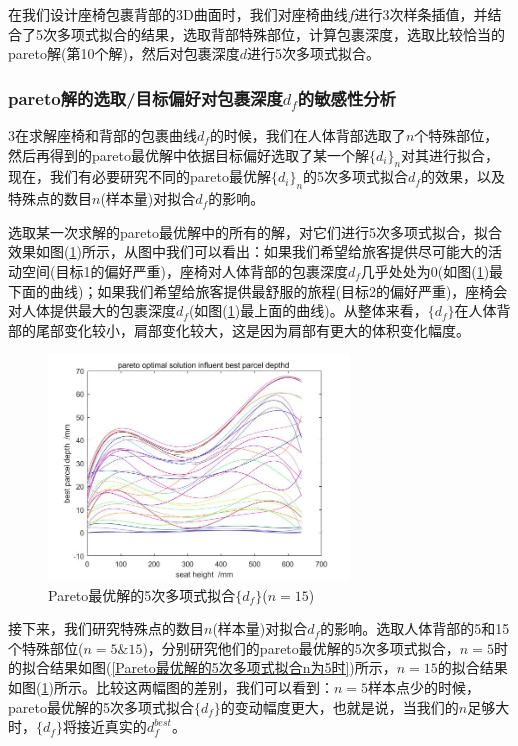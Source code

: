             \par
            在我们设计座椅包裹背部的3D曲面时，我们对座椅曲线$f$进行3次样条插值，并结合了5次多项式拟合的结果，选取背部特殊部位，计算包裹深度，选取比较恰当的pareto解(第10个解)，然后对包裹深度$d$进行5次多项式拟合。
        \subsubsection{pareto解的选取/目标偏好对包裹深度$d_f$的敏感性分析}
            \par
            3在求解座椅和背部的包裹曲线$d_f$的时候，我们在人体背部选取了$n$个特殊部位，然后再得到的pareto最优解中依据目标偏好选取了某一个解$\{d_i \}_n$对其进行拟合，现在，我们有必要研究不同的pareto最优解$\{d_i\}_n$的5次多项式拟合$d_f$的效果，以及特殊点的数目$n$(样本量)对拟合$d_f$的影响。
            \par
            选取某一次求解的pareto最优解中的所有的解，对它们进行5次多项式拟合，拟合效果如图(\ref{Pareto最优解的5次多项式拟合})所示，从图中我们可以看出：如果我们希望给旅客提供尽可能大的活动空间(目标1的偏好严重)，座椅对人体背部的包裹深度$d_f$几乎处处为0(如图(\ref{Pareto最优解的5次多项式拟合})最下面的曲线)；如果我们希望给旅客提供最舒服的旅程(目标2的偏好严重)，座椅会对人体提供最大的包裹深度$d_f$(如图(\ref{Pareto最优解的5次多项式拟合})最上面的曲线)。从整体来看，$\{d_f \}$在人体背部的尾部变化较小，肩部变化较大，这是因为肩部有更大的体积变化幅度。
            \begin{figure}[H]
            \centering
            \includegraphics[width=8cm]{images/effect_pareto_df.jpg}
            \caption{Pareto最优解的5次多项式拟合$\{d_f \}$($n=15$)}
            \label{Pareto最优解的5次多项式拟合}
            \end{figure}
            \par
            接下来，我们研究特殊点的数目$n$(样本量)对拟合$d_f$的影响。选取人体背部的5和15个特殊部位($n=5\&15$)，分别研究他们的pareto最优解的5次多项式拟合，$n=5$时的拟合结果如图(\ref{Pareto最优解的5次多项式拟合n为5时})所示，$n=15$的拟合结果如图(\ref{Pareto最优解的5次多项式拟合})所示。比较这两幅图的差别，我们可以看到：$n=5$样本点少的时候，pareto最优解的5次多项式拟合$\{d_f \}$的变动幅度更大，也就是说，当我们的$n$足够大时，$\{d_f \}$将接近真实的$d_f^{best}$。
